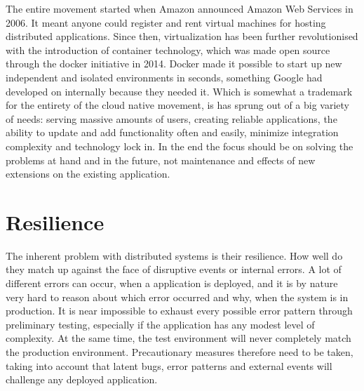 The entire movement started when Amazon announced Amazon Web Services in 2006. It meant anyone could register and rent virtual machines for hosting distributed applications. Since then, virtualization has been further revolutionised with the introduction of container technology, which was made open source through the docker initiative in 2014. Docker made it possible to start up new independent and isolated environments in seconds, something Google had developed on internally because they needed it\cite{bernstein2014containers}. Which is somewhat a trademark for the entirety of the cloud native movement, is has sprung out of a big variety of needs: serving massive amounts of users, creating reliable applications, the ability to update and add functionality often and easily, minimize integration complexity and technology lock in. In the end the focus should be on solving the problems at hand and in the future, not maintenance and effects of new extensions on the existing application.


\section{Resilience}

The inherent problem with distributed systems is their resilience. How well do they match up against the face of disruptive events or internal errors. A lot of different errors can occur, when a application is deployed, and it is by nature very hard to reason about which error occurred and why, when the system is in production. It is near impossible to exhaust every possible error pattern through preliminary testing, especially if the application has any modest level of complexity. At the same time, the test environment will never completely match the production environment. Precautionary measures therefore need to be taken, taking into account that latent bugs, error patterns and external events will challenge any deployed application. 



